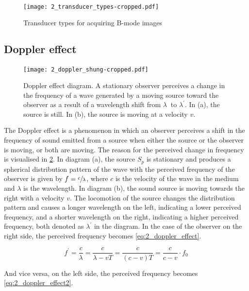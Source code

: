 \begin{figure}[htbp]
	\centering
	\texttt{[image: 2\_transducer\_types-cropped.pdf]}
	\caption[Transducer types for acquiring B-mode images]{Transducer types for acquiring B-mode images \cite{JensenUltrasoundBook}}
	\label{fig:2_transducer_types}
\end{figure}

\subsection{Doppler effect} \label{sec:doppler_effect}

\begin{figure}[htbp]
	\centering
	\texttt{[image: 2\_doppler\_shung-cropped.pdf]}
	\caption[Doppler effect diagram]{Doppler effect diagram. A stationary observer perceives a change in the frequency of a wave generated by a moving source toward the observer as a result of a wavelength shift from $\lambda\ $ to $\lambda^{\prime}$. In (a), the source is still. In (b), the source is moving at a velocity $v$. \cite{ShungUltrasound_Book}}
	\label{fig:2_doppler_effect}
\end{figure}

The Doppler effect is a phenomenon in which an observer perceives a shift in the frequency of sound emitted from a source when either the source or the observer is moving, or both are moving. The reason for the perceived change in frequency is visualised in \cref{fig:2_doppler_effect}. In diagram (a), the source $S_{p}$ is stationary and produces a spherical distribution pattern of the wave with the perceived frequency of the observer is given by $f=\sfrac{c}{\lambda}$, where $c$ is the velocity of the wave in the medium and $\lambda$ is the wavelength. In diagram (b), the sound source is moving towards the right with a velocity $v$. The locomotion of the source changes the distribution pattern and causes a longer wavelength on the left, indicating a lower perceived frequency, and a shorter wavelength on the right, indicating a higher perceived frequency, both denoted as $\lambda^{\prime}$ in the diagram. In the case of the observer on the right side, the perceived frequency becomes \cref{eq:2_doppler_effect}.

\begin{equation} \label{eq:2_doppler_effect}
	f^{\prime} = \frac{c}{\lambda} = \frac{c}{\lambda - v T} = \frac{c}{(c-v)T} = \frac{c}{c-v}\cdot f_{0}
\end{equation}

And vice versa, on the left side, the perceived frequency becomes \cref{eq:2_doppler_effect2}.

